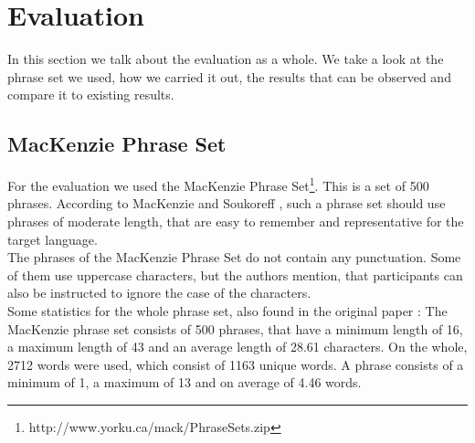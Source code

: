 \chapter{Evaluation}

In this section we talk about the evaluation as a whole. We take a look at the phrase set we used, how we carried it out, the results that can be observed and compare it to existing results.

\section{MacKenzie Phrase Set}
For the evaluation we used the MacKenzie Phrase Set\footnote{http://www.yorku.ca/mack/PhraseSets.zip}. This is a set of 500 phrases. According to MacKenzie and Soukoreff \cite{10.1145/765891.765971}, such a phrase set should use phrases of moderate length, that are easy to remember and representative for the target language.\\
The phrases of the MacKenzie Phrase Set do not contain any punctuation. Some of them use uppercase characters, but the authors mention, that participants can also be instructed to ignore the case of the characters.\\
Some statistics for the whole phrase set, also found in the original paper \cite{10.1145/765891.765971}: The MacKenzie phrase set consists of 500 phrases, that have a minimum length of 16, a maximum length of 43 and an average length of 28.61 characters. On the whole, 2712 words were used, which consist of 1163 unique words. A phrase consists of a minimum of 1, a maximum of 13 and on average of 4.46 words.

